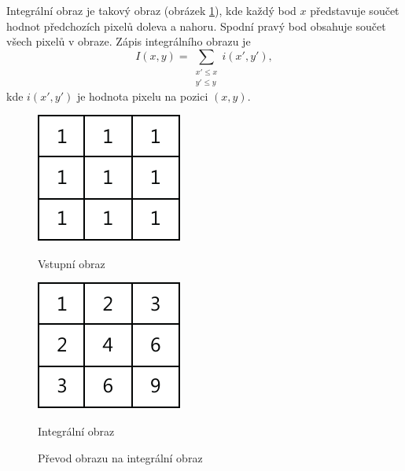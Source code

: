 Integrální obraz je takový obraz (obrázek \ref{fig:integralimage}), kde každý bod $x$ představuje součet hodnot předchozích pixelů doleva a nahoru. Spodní pravý bod obsahuje součet všech pixelů v obraze.
Zápis integrálního obrazu je
\begin{equation*}
\label{integralimage}
 I(x, y) = \sum_{\substack{x' \leq x \\ y' \leq y}}{} i(x', y'),
\end{equation*}
kde $i(x', y')$ je hodnota pixelu na pozici $(x, y)$.
\begin{figure}[H]
\centering
\begin{minipage}{.4\textwidth}
  \centering
  \includegraphics[width=.5\linewidth]{figures/ii_input}
  \caption*{Vstupní obraz}
  \label{fig:ii_input}
\end{minipage}%
\begin{minipage}{.4\textwidth}
  \centering
  \includegraphics[width=.5\linewidth]{figures/ii_output}
  \caption*{Integrální obraz}
  \label{fig:ii_output}
\end{minipage}
\caption{Převod obrazu na integrální obraz}
\label{fig:integralimage}
\end{figure}


